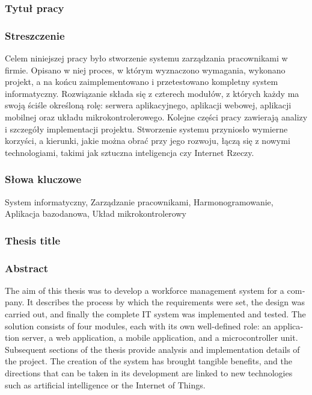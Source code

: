 \subsubsection*{Tytuł pracy}
\Title

\subsubsection*{Streszczenie}

Celem niniejszej pracy było stworzenie systemu zarządzania pracownikami w firmie. Opisano w niej proces, w którym wyznaczono wymagania, wykonano projekt, a na końcu zaimplementowano i przetestowano kompletny system informatyczny. Rozwiązanie składa się z czterech modułów, z których każdy ma swoją ściśle określoną rolę: serwera aplikacyjnego, aplikacji webowej, aplikacji mobilnej oraz układu mikrokontrolerowego. Kolejne części pracy zawierają analizy i szczegóły implementacji projektu. Stworzenie systemu przyniosło wymierne korzyści, a kierunki, jakie można obrać przy jego rozwoju, łączą się z nowymi technologiami, takimi jak sztuczna inteligencja czy Internet Rzeczy.

\subsubsection*{Słowa kluczowe}

System informatyczny, Zarządzanie pracownikami, Harmonogramowanie, \newline Aplikacja bazodanowa, Układ mikrokontrolerowy

\subsubsection*{Thesis title}
\begin{otherlanguage}{british}
    \TitleAlt
\end{otherlanguage}

\subsubsection*{Abstract}
\begin{otherlanguage}{british}

    The aim of this thesis was to develop a workforce management system for a company. It describes the process by which the requirements were set, the design was carried out, and finally the complete IT system was implemented and tested. The solution consists of four modules, each with its own well-defined role: an application server, a web application, a mobile application, and a microcontroller unit. Subsequent sections of the thesis provide analysis and implementation details of the project. The creation of the system has brought tangible benefits, and the directions that can be taken in its development are linked to new technologies such as artificial intelligence or the Internet of Things.

\end{otherlanguage}
